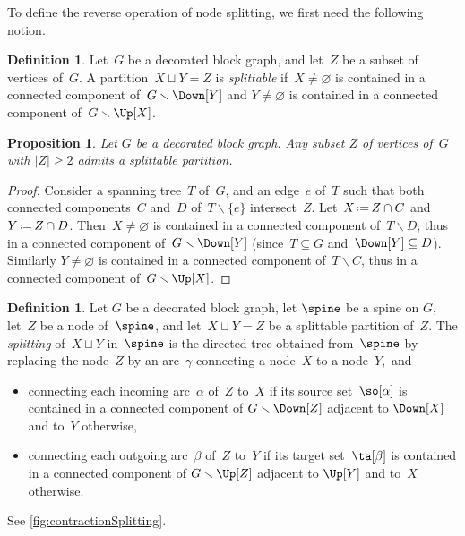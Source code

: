 \documentclass{amsart}
\newtheorem{proposition}[theorem]{Proposition}
\theoremstyle{definition}
\newtheorem{definition}[theorem]{Definition}
\newcommand{\ssm}{\smallsetminus} %
\newcommand{\eqdef}{\mbox{\,\raisebox{0.2ex}{\scriptsize\ensuremath{\mathrm:}}\ensuremath{=}\,}} %
\newcommand{\darkblue}{\color{darkblue}} %
\newcommand{\defn}[1]{\textsl{\darkblue #1}} %
\begin{document}
To define the reverse operation of node splitting, we first need the following notion.

\begin{definition}
  \label{def:splittable}
  Let~$G$ be a decorated block graph, and let~$Z$ be a subset of vertices of~$G$.
  A partition~$X \sqcup Y = Z$ is \defn{splittable} if~$X \ne \varnothing$ is contained in a connected component of~$G \ssm \Down[Y]$ and $Y \ne \varnothing$ is contained in a connected component of~$G \ssm \Up[X]$.
\end{definition}

\begin{proposition}
  \label{prop:splittablePartitions}
  Let $G$ be a decorated block graph. Any subset $Z$ of vertices of~$G$ with $|Z| \ge 2$ admits a splittable partition.
\end{proposition}

\begin{proof} 
  Consider a spanning tree~$T$ of~$G$, and an edge~$e$ of~$T$ such that both connected components~$C$ and~$D$ of~$T \ssm \{e\}$ intersect~$Z$.
  Let~$X \eqdef Z \cap C$ and~$Y \eqdef Z \cap D$.
  Then~$X \ne \varnothing$ is contained in a connected component of~$T \ssm D$, thus in a connected component of~$G \ssm \Down[Y]$ (since~$T \subseteq G$ and~$\Down[Y] \subseteq D$).
  Similarly $Y \ne \varnothing$ is contained in a connected component of~$T \ssm C$, thus in a connected component of~$G \ssm \Up[X]$.
\end{proof}

\begin{definition}
  \label{def:nodeSplitting} 
  Let $G$ be a decorated block graph, let $\spine$ be a spine on $G$, let~$Z$ be a node of~$\spine$, and let~$X \sqcup Y = Z$ be a splittable partition of~$Z$.
  The \defn{splitting} of~$X \sqcup Y$ in~$\spine$ is the directed tree obtained from~$\spine$ by replacing the node~$Z$ by an arc~$\gamma$ connecting a node~$X$ to a node~$Y$,~and
  \begin{itemize}
    \item connecting each incoming arc~$\alpha$ of~$Z$ to~$X$ if its source set~$\so[\alpha]$ is contained in a connected component of $G \ssm \Down[Z]$ adjacent to $\Down[X]$ and to~$Y$ otherwise, 
    \item connecting each outgoing arc~$\beta$ of~$Z$ to~$Y$ if its target set~$\ta[\beta]$ is contained in a connected component of $G \ssm \Up[Z]$ adjacent to $\Up[Y]$ and to~$X$ otherwise.
  \end{itemize}
  See \cref{fig:contractionSplitting}.
\end{definition}
\end{document}
